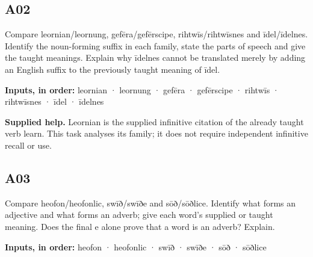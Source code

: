 \par\begin{minipage}{\linewidth}\raggedright
\subsection*{A02}

Compare leornian/\allowbreak{}leornung, gefēra/\allowbreak{}gefērscipe, rihtwīs/\allowbreak{}rihtwīsnes and īdel/\allowbreak{}īdelnes. Identify the noun-forming suffix in each family, state the parts of speech and give the taught meanings. Explain why īdelnes cannot be translated merely by adding an English suffix to the previously taught meaning of īdel.

\textbf{Inputs, in order:} leornian · leornung · gefēra · gefērscipe · rihtwīs · rihtwīsnes · īdel · īdelnes

\end{minipage}\par\addvspace{4pt}

\textbf{Supplied help.} Leornian is the supplied infinitive citation of the already taught verb learn. This task analyses its family; it does not require independent infinitive recall or use.

\par\begin{minipage}{\linewidth}\raggedright
\subsection*{A03}

Compare heofon/\allowbreak{}heofonlic, swīð/\allowbreak{}swīðe and sōð/\allowbreak{}sōðlice. Identify what forms an adjective and what forms an adverb; give each word’s supplied or taught meaning. Does the final e alone prove that a word is an adverb? Explain.

\textbf{Inputs, in order:} heofon · heofonlic · swīð · swīðe · sōð · sōðlice

\end{minipage}\par\addvspace{4pt}

